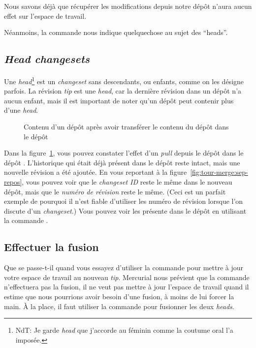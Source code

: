 Nous savons déjà que récupérer les modifications depuis notre dépôt 
 n'aura aucun effet sur l'espace de travail.


Néanmoins, la commande  nous indique quelquechose au 
sujet des ``heads''.

\subsection{\textit{Head changesets}} %

Une \textit{head}\footnote{NdT: Je garde \textit{head} que j'accorde 
au féminin comme la coutume oral l'a imposée.} est un \textit{changeset} 
sans descendants, ou enfants, comme on les désigne parfois. La révision 
\textit{tip} est une \textit{head}, car la dernière révision dans un dépôt 
n'a aucun enfant, mais il est important de noter qu'un dépôt peut contenir 
plus d'une \textit{head}.

\begin{figure}[ht]
  \centering
  \caption{Contenu d'un dépôt après avoir transférer le contenu du dépôt 
     dans le dépôt }
  \label{fig:tour-merge:pull}
\end{figure}

Dans la figure~\ref{fig:tour-merge:pull}, vous pouvez constater l'effet
d'un \textit{pull} depuis le dépôt  dans le dépôt 
. L'historique qui était déjà présent dans le dépôt
 reste intact, mais une nouvelle révision a été 
ajoutée. En vous reportant à la figure~\ref{fig:tour-merge:sep-repos},
vous pouvez voir que le \textit{\emph{changeset ID}} reste le même dans
le nouveau dépôt, mais que le \emph{numéro de révision} reste le même.
(Ceci est un parfait exemple de pourquoi il n'est fiable d'utiliser les
numéro de révision lorsque l'on discute d'un \textit{changeset}.) Vous
pouvez voir les  présente dans le dépôt en utilisant la 
commande .

\subsection{Effectuer la fusion}

Que se passe-t-il quand vous essayez d'utiliser la commande  
pour mettre à jour votre espace de travail au nouveau \textit{tip}.
Mercurial nous prévient que la commande  n'effectuera pas
la fusion, il ne veut pas mettre à jour l'espace de travail quand il 
estime que nous pourrions avoir besoin d'une fusion, à moins de lui
forcer la main. À la place, il faut utiliser la commande 
pour fusionner les deux \textit{heads}.

